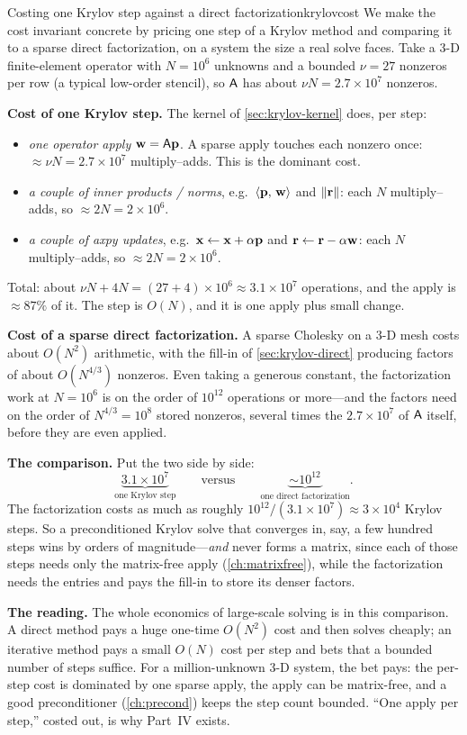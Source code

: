 \begin{workedexample}{Costing one Krylov step against a direct factorization}{krylovcost}
We make the cost invariant concrete by pricing one step of a Krylov method and
comparing it to a sparse direct factorization, on a system the size a real solve
faces. Take a 3-D finite-element operator with $N=10^6$ unknowns and a bounded
$\nu=27$ nonzeros per row (a typical low-order stencil), so $\mathsf{A}$ has about
$\nu N=2.7\times10^7$ nonzeros.

\textbf{Cost of one Krylov step.} The kernel of \cref{sec:krylov-kernel} does, per
step:
\begin{itemize}[nosep]
  \item \emph{one operator apply} $\mathbf{w}=\mathsf{A}\mathbf{p}$. A sparse apply touches each
  nonzero once: $\approx\nu N=2.7\times10^7$ multiply--adds. This is the dominant
  cost.
  \item \emph{a couple of inner products / norms}, e.g.\ $\left\langle \mathbf{p},\, \mathbf{w}\right\rangle$ and
  $\lVert\mathbf{r}\rVert$: each $N$ multiply--adds, so $\approx 2N=2\times10^6$.
  \item \emph{a couple of \emph{axpy} updates}, e.g.\ $\mathbf{x}\leftarrow\mathbf{x}+\alpha\mathbf{p}$ and
  $\mathbf{r}\leftarrow\mathbf{r}-\alpha\mathbf{w}$: each $N$ multiply--adds, so $\approx 2N=2\times10^6$.
\end{itemize}
Total: about $\nu N+4N=(27+4)\times10^6\approx 3.1\times10^7$ operations, and the apply
is $\approx87\%$ of it. The step is $O(N)$, and it is one apply plus small change.

\tcblower
\textbf{Cost of a sparse direct factorization.} A sparse Cholesky on a 3-D mesh costs
about $O(N^2)$ arithmetic, with the fill-in of \cref{sec:krylov-direct} producing
factors of about $O(N^{4/3})$ nonzeros. Even taking a generous constant, the
factorization work at $N=10^6$ is on the order of $10^{12}$ operations or more---and
the factors need on the order of $N^{4/3}=10^8$ stored nonzeros, several times the
$2.7\times10^7$ of $\mathsf{A}$ itself, before they are even applied.

\textbf{The comparison.} Put the two side by side:
\[
  \underbrace{3.1\times10^7}_{\text{one Krylov step}}
  \qquad\text{versus}\qquad
  \underbrace{\sim 10^{12}}_{\text{one direct factorization}} .
\]
The factorization costs as much as roughly $10^{12}/(3.1\times10^7)\approx3\times10^4$
Krylov steps. So a preconditioned Krylov solve that converges in, say, a few hundred
steps wins by orders of magnitude---\emph{and} never forms a matrix, since each of
those steps needs only the matrix-free apply (\cref{ch:matrixfree}), while the
factorization needs the entries and pays the fill-in to store its denser factors.

\textbf{The reading.} The whole economics of large-scale solving is in this
comparison. A direct method pays a huge one-time $O(N^2)$ cost and then solves
cheaply; an iterative method pays a small $O(N)$ cost per step and bets that a
bounded number of steps suffice. For a million-unknown 3-D system, the bet pays:
the per-step cost is dominated by one sparse apply, the apply can be matrix-free,
and a good preconditioner (\cref{ch:precond}) keeps the step count bounded. ``One
apply per step,'' costed out, is why Part~IV exists.
\end{workedexample}

